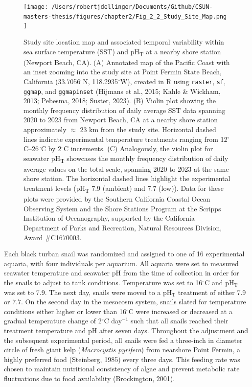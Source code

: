\documentclass{CSUNthesis}
\begin{document}
\begin{figure}[H]
  \centering
  \texttt{[image:  /Users/robertjdellinger/Documents/Github/CSUN-masters-thesis/figures/chapter2/Fig\_2\_2\_Study\_Site\_Map.png ]}
  \caption[Study site location map and associated SST and pH\textsubscript{T} variability.]{Study site location map and associated temporal variability within sea surface temperature (SST) and pH\textsubscript{T} at a nearby shore station (Newport Beach, CA). (A) Annotated map of the Pacific Coast with an inset zooming into the study site at Point Fermin State Beach, California (33.7056$^\circ$N, 118.2935$^\circ$W), created in R using \texttt{raster}, \texttt{sf}, \texttt{ggmap}, and \texttt{ggmapinset} (Hijmans et al., 2015; Kahle \& Wickham, 2013; Pebesma, 2018; Suster, 2023). (B) Violin plot showing the monthly frequency distribution of daily average SST data spanning 2020 to 2023 from Newport Beach, CA at a nearby shore station approximately $\approx$ 23 km from the study site. Horizontal dashed lines indicate experimental temperature treatments ranging from 12$^\circ$C--26$^\circ$C by 2$^\circ$C increments. (C) Analogously, the violin plot for seawater pH\textsubscript{T} showcases the monthly frequency distribution of daily average values on the total scale, spanning 2020 to 2023 at the same shore station. The horizontal dashed lines highlight the experimental treatment levels (pH\textsubscript{T} 7.9 (ambient) and 7.7 (low)). Data for these plots were provided by the Southern California Coastal Ocean Observing System and the Shore Stations Program at the Scripps Institution of Oceanography, supported by the California Department of Parks and Recreation, Natural Resources Division, Award \#C1670003.}
  \label{fig:study_site_map}
\end{figure}

Each black turban snail was randomized and assigned to one of 16 experimental aquaria, with four individuals per aquarium. All aquaria were set to measured seawater temperature and seawater pH from the time of collection in order for the snails to adjust to tank conditions. Temperature was set to 16\(^\circ\)C and pH\(_\mathrm{T}\) was set to 7.9. The next day, snails were moved to a pH\(_\mathrm{T}\) treatment of either 7.9 or 7.7. On the second day in the mesocosm system, snails slated for temperature conditions either higher or lower than 16\(^\circ\)C were increased or decreased at a gradual temperature change of 2\(^\circ\)C day\(^{-1}\) such that all snails reached their treatment temperature and pH after seven days. Throughout the adjustment and the subsequent experimental period, all snails were fed a three-inch in diameter circle of fresh giant kelp (\textit{Macrocystis pyrifera}) from nearshore Point Fermin, a highly preferred food (Steinberg, 1985) every three days. This feeding rate was chosen to maintain nutritional consistency of algae and prevent metabolic rate fluctuations due to food availability (Brockington, 2001).
\end{document}
